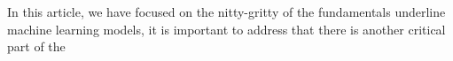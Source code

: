 In this article, we have focused on the nitty-gritty of the fundamentals underline machine learning models, it is important to address that there is another critical part of the 